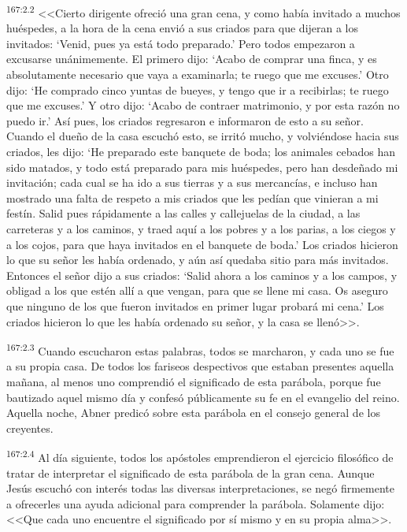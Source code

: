 \par 
\textsuperscript{167:2.2} <<Cierto dirigente ofreció una gran cena, y como había invitado a muchos huéspedes, a la hora de la cena envió a sus criados para que dijeran a los invitados:
`Venid, pues ya está todo preparado.' Pero todos empezaron a excusarse unánimemente. El primero dijo: `Acabo de comprar una finca, y es absolutamente necesario que vaya a examinarla; te ruego que me excuses.' Otro dijo: `He comprado cinco yuntas de bueyes, y tengo que ir a recibirlas; te ruego que me excuses.' Y otro dijo: `Acabo de contraer matrimonio, y por esta razón no puedo ir.' Así pues, los criados regresaron e informaron de esto a su señor. Cuando el dueño de la casa escuchó esto, se irritó mucho, y volviéndose hacia sus criados, les dijo: `He preparado este banquete de boda; los animales cebados han sido matados, y todo está preparado para mis huéspedes, pero han desdeñado mi invitación; cada cual se ha ido a sus tierras y a sus mercancías, e incluso han mostrado una falta de respeto a mis criados que les pedían que vinieran a mi festín. Salid pues rápidamente a las calles y callejuelas de la ciudad, a las carreteras y a los caminos, y traed aquí a los pobres y a los parias, a los ciegos y a los cojos, para que haya invitados en el banquete de boda.' Los criados hicieron lo que su señor les había ordenado, y aún así quedaba sitio para más invitados. Entonces el señor dijo a sus criados: `Salid ahora a los caminos y a los campos, y obligad a los que estén allí a que vengan, para que se llene mi casa. Os aseguro que ninguno de los que fueron invitados en primer lugar probará mi cena.' Los criados hicieron lo que les había ordenado su señor, y la casa se llenó>>.

\par 
\textsuperscript{167:2.3} Cuando escucharon estas palabras, todos se marcharon, y cada uno se fue a su propia casa. De todos los fariseos despectivos que estaban presentes aquella mañana, al menos uno comprendió el significado de esta parábola, porque fue bautizado aquel mismo día y confesó públicamente su fe en el evangelio del reino. Aquella noche, Abner predicó sobre esta parábola en el consejo general de los creyentes.

\par 
\textsuperscript{167:2.4} Al día siguiente, todos los apóstoles emprendieron el ejercicio filosófico de tratar de interpretar el significado de esta parábola de la gran cena. Aunque Jesús escuchó con interés todas las diversas interpretaciones, se negó firmemente a ofrecerles una ayuda adicional para comprender la parábola. Solamente dijo: <<Que cada uno encuentre el significado por sí mismo y en su propia alma>>.

